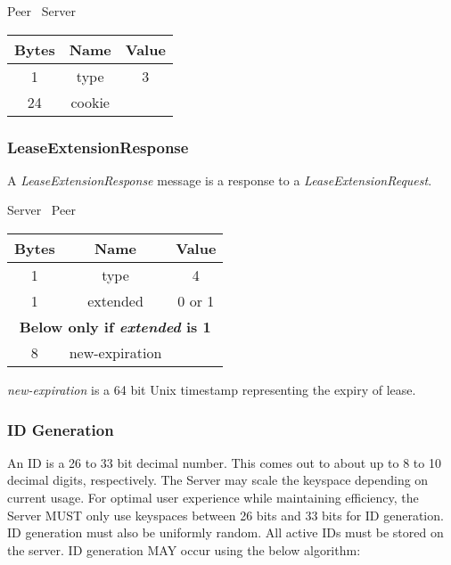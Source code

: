 \documentclass{article}
\begin{document}
    \begin{center}
        Peer \textrightarrow\ Server\\
        \begin{tabular}{|c|c|c|}
            \hline
            \textbf{Bytes} & \textbf{Name} & \textbf{Value} \\
            \hline
            1              & type          & 3              \\
            \hline
            24             & cookie        &                \\
            \hline
        \end{tabular}
    \end{center}

    \subsubsection{LeaseExtensionResponse}

    A \emph{LeaseExtensionResponse} message is a response to a \emph{LeaseExtensionRequest}.

    \begin{center}
        Server \textrightarrow\ Peer\\
        \begin{tabular}{|c|c|c|}
            \hline
            \textbf{Bytes} & \textbf{Name}  & \textbf{Value} \\
            \hline
            1              & type           & 4              \\
            \hline
            1              & extended       & 0 or 1         \\
            \hline
            \multicolumn{3}{|c|}{\textbf{Below only if \emph{extended} is 1} } \\
            \hline
            8              & new-expiration &                \\
            \hline
        \end{tabular}
    \end{center}

    \emph{new-expiration} is a 64 bit Unix timestamp representing the expiry of lease.

    \subsubsection{ID Generation}

    An ID is a 26 to 33 bit decimal number. This comes out to about up to 8 to 10 decimal digits, respectively. The
    Server may scale the keyspace depending on current usage. For optimal user experience while maintaining
    efficiency, the Server MUST only use keyspaces between 26 bits and 33 bits for ID generation. ID generation must
    also be uniformly random. All active IDs must be stored on the server. ID generation MAY occur using the below
    algorithm:\\
\end{document}
